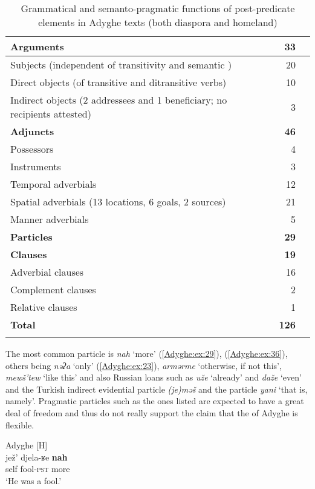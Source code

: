 \documentclass[output=paper,colorlinks,citecolor=brown, draft]{langscibook}
\begin{document}
\begin{table}
\begin{tabularx}{\textwidth}{Qrr}
\lsptoprule
\textbf{Arguments} & \textbf{33} \\
\midrule
{Subjects (independent of transitivity and semantic )} & 20 \\
{Direct objects (of transitive and ditransitive verbs)} & 10 \\
{Indirect objects (2 addressees and 1 beneficiary; no recipients attested)} & 3 \\
\tablevspace
\textbf{Adjuncts} & \textbf{46} \\
\midrule
{Possessors} & 4 \\
{Instruments} & 3 \\
{Temporal adverbials} & 12 \\
{Spatial adverbials (13 locations, 6 goals, 2 sources)} & 21 \\
{Manner adverbials} & 5 \\
\tablevspace
\textbf{Particles} & \textbf{29} \\
\midrule
\tablevspace
\textbf{Clauses} & \textbf{19} \\
\midrule
{Adverbial clauses} & 16 \\
{Complement clauses} & 2 \\
{Relative clauses} & 1 \\
\midrule
 \textbf{Total} & \textbf{126} \\
\lspbottomrule
 \end{tabularx}
 \caption{Grammatical and semanto-pragmatic functions of post-predicate elements in Adyghe texts (both diaspora and homeland)}
 \label{Adyghe:tab:1}
\end{table}

The most common particle is \textit{nah} `more' (\ref{Adyghe:ex:29}), (\ref{Adyghe:ex:36}), others being \textit{nəʔa} `only' (\ref{Adyghe:ex:23}), \textit{armərme} `otherwise, if not this', \textit{mewš'tew} `like this' and also Russian loans such as \textit{uže} `already' and \textit{daže} `even' and the Turkish indirect evidential particle \textit{ (je)məš} and the particle \textit{yani} `that is, namely'. Pragmatic particles such as the ones listed are expected to have a great deal of freedom and thus do not really support the claim that the  of Adyghe is flexible.

\ea\label{Adyghe:ex:29}
Adyghe \citep[218]{hohlig1997kontaktbedingter} [H] \\
\gll jež' djela-ʁe \textbf{nah} \\
self fool\textsc{-pst} more \\
\glt `He was a fool.' 
\z
\end{document}
